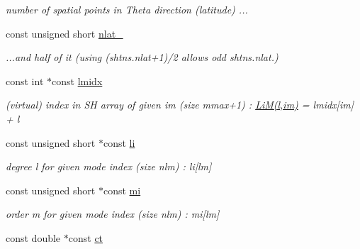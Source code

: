 \begin{DoxyCompactItemize}
\begin{DoxyCompactList}\small\item\em number of spatial points in Theta direction (latitude) ... \end{DoxyCompactList}\item 
\hypertarget{structshtns__info_ae83324d5307e1aeed0bc529df551e7b0}{}const unsigned short \hyperlink{structshtns__info_ae83324d5307e1aeed0bc529df551e7b0}{nlat\+\_}\label{structshtns__info_ae83324d5307e1aeed0bc529df551e7b0}

\begin{DoxyCompactList}\small\item\em ...and half of it (using (shtns.\+nlat+1)/2 allows odd shtns.\+nlat.) \end{DoxyCompactList}\item 
\hypertarget{structshtns__info_a2606673117c82134e7d68a108de7de00}{}const int $\ast$const \hyperlink{structshtns__info_a2606673117c82134e7d68a108de7de00}{lmidx}\label{structshtns__info_a2606673117c82134e7d68a108de7de00}

\begin{DoxyCompactList}\small\item\em (virtual) index in S\+H array of given im (size mmax+1) \+: \hyperlink{shtns_8h_aee0d42089971d399238da3aaca4d9ca1}{Li\+M(l,im)} = lmidx\mbox{[}im\mbox{]} + l \end{DoxyCompactList}\item 
\hypertarget{structshtns__info_a26398e926ef26bdaa4dedf21fd648887}{}const unsigned short $\ast$const \hyperlink{structshtns__info_a26398e926ef26bdaa4dedf21fd648887}{li}\label{structshtns__info_a26398e926ef26bdaa4dedf21fd648887}

\begin{DoxyCompactList}\small\item\em degree l for given mode index (size nlm) \+: li\mbox{[}lm\mbox{]} \end{DoxyCompactList}\item 
\hypertarget{structshtns__info_ac7c8fb32d62b7903f56133e943ab36c0}{}const unsigned short $\ast$const \hyperlink{structshtns__info_ac7c8fb32d62b7903f56133e943ab36c0}{mi}\label{structshtns__info_ac7c8fb32d62b7903f56133e943ab36c0}

\begin{DoxyCompactList}\small\item\em order m for given mode index (size nlm) \+: mi\mbox{[}lm\mbox{]} \end{DoxyCompactList}\item 
\hypertarget{structshtns__info_a0f41958818a4a8a7df6ac079f81c8233}{}const double $\ast$const \hyperlink{structshtns__info_a0f41958818a4a8a7df6ac079f81c8233}{ct}\label{structshtns__info_a0f41958818a4a8a7df6ac079f81c8233}


\end{DoxyCompactItemize}
